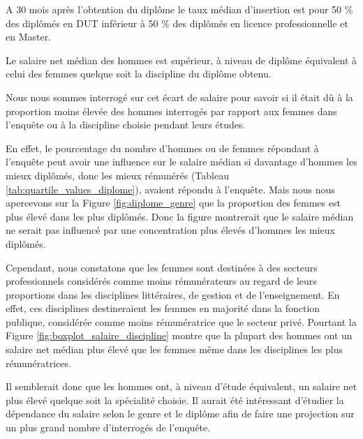 \documentclass[12pt, a4paper, titlepage, table]{article}
\begin{document}
A 30 mois après l'obtention du diplôme le taux médian d'insertion est pour 50 \% des diplômés en DUT inférieur à 50 \% des diplômés en licence professionnelle et en Master.  

Le salaire net médian des hommes est supérieur, à niveau de diplôme équivalent à celui des femmes quelque soit la discipline du diplôme obtenu.

Nous nous sommes interrogé sur cet écart de salaire pour savoir si il était dû à la proportion moins élevée des hommes interrogés par rapport aux femmes dans l'enquête ou à la discipline choisie pendant leurs études.

En effet, le pourcentage du nombre d'hommes ou de femmes répondant à l'enquête peut avoir une influence sur le salaire médian si davantage d'hommes les mieux diplômés, donc les mieux rémunérés (Tableau \ref{tab:quartile_values_diplome}), avaient répondu à l'enquête. Mais nous nous apercevons sur la Figure \ref{fig:diplome_genre} que la proportion des femmes est plus élevé dans les plus diplômés. Donc la figure montrerait que le salaire médian ne serait pas influencé par une concentration plus élevés d'hommes les mieux diplômés. 

Cependant, nous constatons que les femmes sont destinées à des secteurs professionnels considérés comme moins rémunérateurs au regard de leurs proportions dans les disciplines littéraires, de gestion et de l'enseignement. En effet, ces disciplines destineraient les femmes en majorité dans la fonction publique, considérée comme moins rémunératrice que le secteur privé.
Pourtant la Figure \ref{fig:boxplot_salaire_discipline} montre que la plupart des hommes ont un salaire net médian plus élevé que les femmes même dans les disciplines les plus rémunératrices.

Il semblerait donc que les hommes ont, à niveau d'étude équivalent, un salaire net plus élevé quelque soit la spécialité choisie.
Il aurait été intéressant d'étudier la dépendance du salaire selon le genre et le diplôme afin de faire une projection sur un plus grand nombre d'interrogés de l'enquête. 
\end{document}

